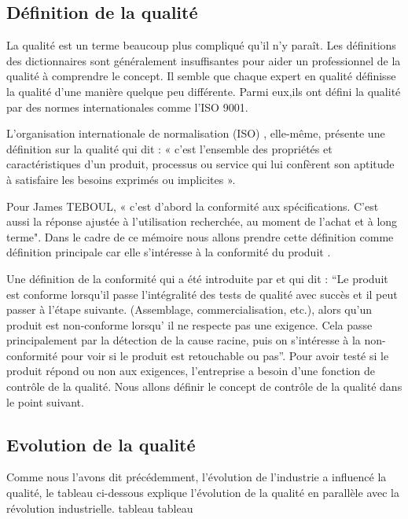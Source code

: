 \subsection{Définition de la qualité}
La qualité est un terme beaucoup plus compliqué qu'il n'y paraît.  Les définitions des dictionnaires sont généralement insuffisantes pour aider un professionnel de la qualité à comprendre le concept.  Il semble que chaque expert en qualité définisse la qualité d'une manière quelque peu différente. Parmi eux,ils ont défini la qualité par des normes internationales comme l’ISO 9001.

L’organisation internationale de normalisation (ISO) \cite{ISOOrganisationInternationale}, elle-même, présente une définition sur la qualité qui dit : « c’est l’ensemble des propriétés et caractéristiques d’un produit, processus ou service qui lui confèrent son aptitude à satisfaire les besoins exprimés ou implicites ».

Pour James TEBOUL, « c’est d’abord la conformité aux spécifications. C’est aussi la réponse ajustée à l’utilisation recherchée, au moment de l’achat et à long terme". Dans le cadre de ce mémoire nous allons prendre cette définition comme définition principale car elle s'intéresse à la conformité du produit \cite{ControleQualiteDefinition}.

Une définition de la conformité qui a été introduite par et qui dit : “Le produit est conforme lorsqu'il passe l’intégralité des tests de qualité avec succès et il peut passer à l’étape suivante. (Assemblage, commercialisation, etc.), alors qu’un produit est non-conforme lorsqu' il ne respecte pas une exigence. Cela passe principalement par la détection de la cause racine, puis on s’intéresse à la non-conformité pour voir si le produit est retouchable ou pas”. Pour avoir testé si le produit répond ou non aux exigences, l'entreprise a besoin d'une fonction de contrôle de la qualité. Nous allons définir le concept de contrôle de la qualité dans le point suivant.

\subsection{Evolution de la qualité}
Comme nous l'avons dit précédemment, l'évolution de l'industrie a influencé la qualité, le tableau ci-dessous explique l'évolution de la qualité en parallèle avec la révolution industrielle.
\newpage
tableau 
\newpage
tableau 
\newpage


